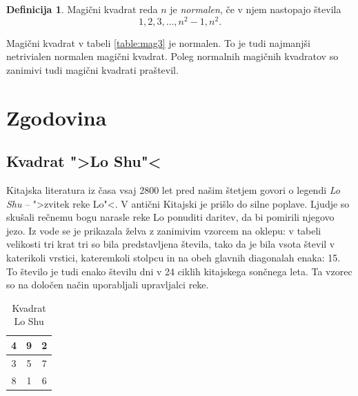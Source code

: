 \documentclass[a4paper,12pt]{article}
\newcommand{\pojem}[1]{\emph{\color{purple}#1}}
\newenvironment{magic}[3]{\begin{table}[!ht]
   \centering
   \caption{#1}
   \label{#2}
   \large
   \begin{tabular}{|*{#3}{c|}}
   \hline}{ \end{tabular}
   \normalsize
\end{table}}
\theoremstyle{definition}
\newtheorem{definicija}{Definicija}
\theoremstyle{plain}
\begin{document}
\begin{definicija}
   Magični kvadrat reda \(n\) je \pojem{normalen}, če v njem nastopajo števila
   \begin{equation}
      \label{eq:numbers}
      1, 2, 3, \ldots, n^2-1, n^2.
   \end{equation}
\end{definicija}

Magični kvadrat v tabeli \ref{table:mag3} je normalen.
To je tudi najmanjši netrivialen normalen magični kvadrat.
Poleg normalnih magičnih kvadratov so zanimivi tudi magični kvadrati praštevil.


\section{Zgodovina}

\subsection{Kvadrat ">Lo Shu"<}

Kitajska literatura iz časa vsaj 2800 let pred našim štetjem govori o legendi
\emph{Lo Shu} -- ">zvitek reke Lo"<. V antični Kitajski je prišlo do
silne poplave. Ljudje so skušali rečnemu bogu narasle reke Lo ponuditi daritev,
da bi pomirili njegovo jezo. Iz vode se je prikazala želva z zanimivim vzorcem
na oklepu: v tabeli velikosti tri krat tri so bila predstavljena števila, tako
da je bila vsota števil v katerikoli vrstici, kateremkoli stolpcu in na obeh
glavnih diagonalah enaka: 15. To število je tudi enako številu dni v 24 ciklih
kitajskega sončnega leta. Ta vzorec so na določen način uporabljali upravljalci
reke.

\begin{magic}{Kvadrat Lo Shu}{table:loshu}{3}
   4 & 9 & 2 \\\hline
   3 & 5 & 7 \\\hline
   8 & 1 & 6 \\\hline
\end{magic}

\end{document}
